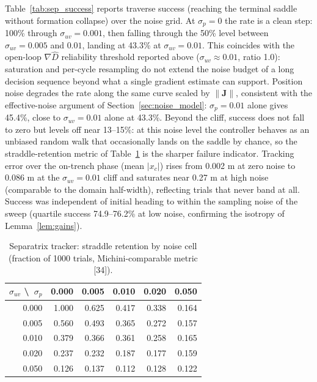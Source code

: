 \documentclass[12pt, letterpaper, oneside]{report}
\begin{document}
Table~\ref{tab:sep_success} reports traverse success (reaching the
terminal saddle without formation collapse) over the noise grid. At
$\sigma_p = 0$ the rate is a clean step: 100\% through
$\sigma_{uv} = 0.001$, then falling through the 50\% level between
$\sigma_{uv} = 0.005$ and $0.01$, landing at 43.3\% at
$\sigma_{uv} = 0.01$. This coincides with the open-loop
$\nabla\hat{D}$ reliability threshold reported above
($\sigma_{uv} \approx 0.01$, ratio 1.0): saturation and per-cycle
resampling do not extend the noise budget
of a long decision sequence beyond what a single gradient estimate can
support. Position noise degrades the rate along the same curve scaled
by $\|\mathbf{J}\|$, consistent with the effective-noise argument of
Section~\ref{sec:noise_model}: $\sigma_p = 0.01$ alone gives 45.4\%,
close to $\sigma_{uv} = 0.01$ alone at 43.3\%. Beyond the cliff, success
does not fall to zero but levels off near 13--15\%: at this noise level
the controller behaves as an unbiased random walk that occasionally
lands on the saddle by chance, so the straddle-retention metric of
Table~\ref{tab:sep_straddle} is the sharper failure indicator. Tracking
error over the on-trench phase (mean $|x_c|$) rises from 0.002 m at zero
noise to 0.086 m at the $\sigma_{uv} = 0.01$ cliff and saturates near
0.27 m at high noise (comparable to the domain half-width), reflecting
trials that never band at all. Success was independent of initial
heading to within the sampling noise of the sweep (quartile success
74.9--76.2\% at low noise, confirming the isotropy of
Lemma~\ref{lem:gains}).

\begin{table}[!t]
\centering
\caption{Separatrix tracker: straddle retention by noise cell (fraction
of 1000 trials, Michini-comparable metric [34]).}
\label{tab:sep_straddle}
\footnotesize
\begin{tabular}{rrrrrr}
\toprule
$\sigma_{uv}$ \textbackslash\ $\sigma_p$ & 0.000 & 0.005 & 0.010 & 0.020 & 0.050 \\
\midrule
0.000 & 1.000 & 0.625 & 0.417 & 0.338 & 0.164 \\
0.005 & 0.560 & 0.493 & 0.365 & 0.272 & 0.157 \\
0.010 & 0.379 & 0.366 & 0.361 & 0.258 & 0.165 \\
0.020 & 0.237 & 0.232 & 0.187 & 0.177 & 0.159 \\
0.050 & 0.126 & 0.137 & 0.112 & 0.128 & 0.122 \\
\bottomrule
\end{tabular}
\end{table}
\end{document}
